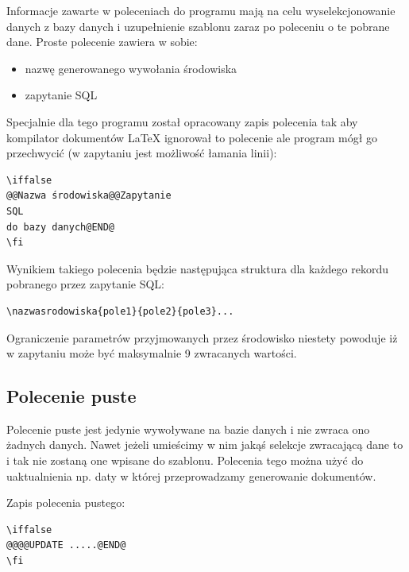 Informacje zawarte w poleceniach do programu mają na celu wyselekcjonowanie danych z bazy danych i uzupełnienie szablonu zaraz po poleceniu o te pobrane dane. Proste polecenie zawiera w sobie:
\begin{itemize}
\item nazwę generowanego wywołania środowiska
\item zapytanie SQL
\end{itemize}
\par
Specjalnie dla tego programu został opracowany zapis polecenia tak aby kompilator dokumentów LaTeX ignorował to polecenie ale program mógł go przechwycić (w zapytaniu jest możliwość łamania linii):
\begin{lstlisting}
\iffalse 
@@Nazwa środowiska@@Zapytanie
SQL
do bazy danych@END@
\fi
\end{lstlisting}
Wynikiem takiego polecenia będzie następująca struktura dla każdego rekordu pobranego przez zapytanie SQL:
\begin{lstlisting}
\nazwasrodowiska{pole1}{pole2}{pole3}...
\end{lstlisting}
Ograniczenie parametrów przyjmowanych przez środowisko niestety powoduje iż w zapytaniu może być maksymalnie 9 zwracanych wartości.

\subsection{Polecenie puste}
Polecenie puste jest jedynie wywoływane na bazie danych i nie zwraca ono żadnych danych. Nawet jeżeli umieścimy w nim jakąś selekcje zwracającą dane to i tak nie zostaną one wpisane do szablonu. Polecenia tego można użyć do uaktualnienia np. daty w której przeprowadzamy generowanie dokumentów.
\par
Zapis polecenia pustego:
\begin{lstlisting}
\iffalse 
@@@@UPDATE .....@END@
\fi
\end{lstlisting}

